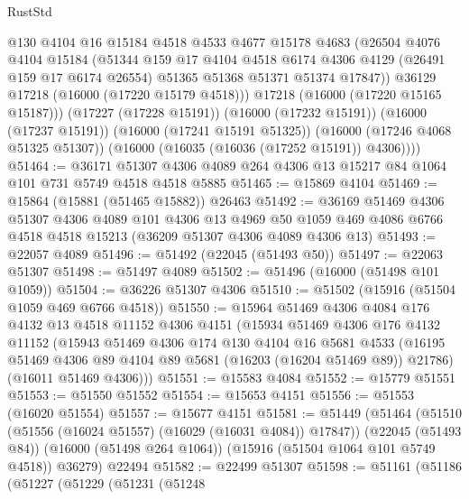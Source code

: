 \begin{lexlean}{RustStd}
\begin{coremodule}
            @130
            @4104
            @16
            @15184
            @4518
            @4533
            @4677
            @15178
            @4683
            (@26504
              @4076
              @4104
              @15184
              (@51344
                @159
                @17
                @4104
                @4518
                @6174
                @4306
                @4129
                (@26491 @159 @17 @6174 @26554)
                @51365
                @51368
                @51371
                @51374
                @17847))
            @36129
            @17218
            (@16000 (@17220 @15179 @4518)))
          @17218
          (@16000 (@17220 @15165 @15187)))
        (@17227 (@17228 @15191))
        (@16000 (@17232 @15191))
        (@16000 (@17237 @15191))
        (@16000 (@17241 @15191 @51325))
        (@16000 (@17246 @4068 @51325 @51307))
        (@16000 (@16035 (@16036 (@17252 @15191)) @4306))))
@51464 := @36171
    @51307
    @4306
    @4089
    @264
    @4306
    @13
    @15217
    @84
    @1064
    @101
    @731
    @5749
    @4518
    @4518
    @5885
@51465 := @15869 @4104
@51469 := @15864 (@15881 (@51465 @15882)) @26463
@51492 := @36169
    @51469
    @4306
    @51307
    @4306
    @4089
    @101
    @4306
    @13
    @4969
    @50
    @1059
    @469
    @4086
    @6766
    @4518
    @4518
    @15213
    (@36209 @51307 @4306 @4089 @4306 @13)
@51493 := @22057 @4089
@51496 := @51492 (@22045 (@51493 @50))
@51497 := @22063 @51307
@51498 := @51497 @4089
@51502 := @51496 (@16000 (@51498 @101 @1059))
@51504 := @36226 @51307 @4306
@51510 := @51502 (@15916 (@51504 @1059 @469 @6766 @4518))
@51550 := @15964
    @51469
    @4306
    @4084
    @176
    @4132
    @13
    @4518
    @11152
    @4306
    @4151
    (@15934
      @51469
      @4306
      @176
      @4132
      @11152
      (@15943
        @51469
        @4306
        @174
        @130
        @4104
        @16
        @5681
        @4533
        (@16195 @51469 @4306 @89 @4104 @89 @5681 (@16203 (@16204 @51469 @89)) @21786)
        (@16011 @51469 @4306)))
@51551 := @15583 @4084
@51552 := @15779 @51551
@51553 := @51550 @51552
@51554 := @15653 @4151
@51556 := @51553 (@16020 @51554)
@51557 := @15677 @4151
@51581 := @51449
    (@51464
      (@51510 (@51556 (@16024 @51557) (@16029 (@16031 @4084)) @17847))
      (@22045 (@51493 @84))
      (@16000 (@51498 @264 @1064))
      (@15916 (@51504 @1064 @101 @5749 @4518))
      @36279)
    @22494
@51582 := @22499 @51307
@51598 := @51161
    (@51186
      (@51227
        (@51229
          (@51231
            (@51248

\end{coremodule}
\end{lexlean}
